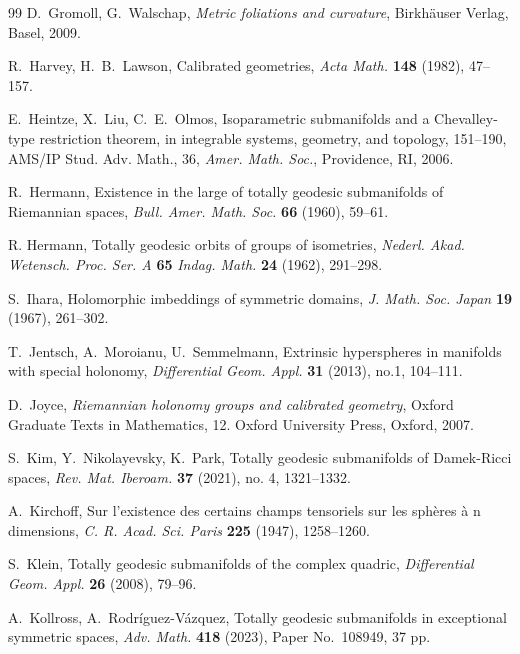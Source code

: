 \documentclass[11pt,a4paper,final]{amsart}
\theoremstyle{definition}
\begin{document}
\begin{thebibliography}{99}
	D.~Gromoll, G.~Walschap, \textit{Metric foliations and curvature}, Birkhäuser Verlag, Basel, 2009.

	R.~Harvey, H.~B.~Lawson, Calibrated geometries, \textit{Acta Math.} \textbf{148} (1982), 47--157.

	E.~Heintze, X.~Liu, C.~E.~Olmos, Isoparametric submanifolds and a Chevalley-type restriction theorem, in integrable systems, geometry, and topology, 151--190, AMS/IP Stud. Adv. Math., 36, \textit{Amer. Math.	Soc.}, Providence, RI, 2006.

	R.~Hermann, Existence in the large of totally geodesic submanifolds of Riemannian spaces, \textit{Bull. Amer. Math. Soc.} \textbf{66} (1960), 59--61.

	 R. Hermann, Totally geodesic orbits of groups of isometries, \textit{Nederl. Akad. Wetensch. Proc. Ser. A} \textbf{65} \textit{Indag. Math.} \textbf{24} (1962), 291--298.

	S.~Ihara, Holomorphic imbeddings of symmetric domains, \textit{J. Math. Soc. Japan} \textbf{19} (1967), 261--302.

	T.~Jentsch, A.~Moroianu, U.~Semmelmann, Extrinsic hyperspheres in manifolds with special holonomy, \textit{Differential Geom. Appl.} \textbf{31} (2013), no.1, 104--111.

	 D.~Joyce,  \textit{Riemannian holonomy groups and calibrated geometry}, Oxford Graduate Texts in Mathematics, 12. Oxford University Press, Oxford, 2007.

	S.~Kim, Y.~Nikolayevsky, K.~Park, Totally geodesic submanifolds of Damek-Ricci spaces, \textit{Rev. Mat. Iberoam.} \textbf{37} (2021), no. 4, 1321--1332.

	A.~Kirchoff, Sur l'existence des certains champs tensoriels sur les sphères à n dimensions, \textit{C. R. Acad. Sci. Paris} \textbf{225} (1947), 1258--1260.

	S.~Klein, Totally geodesic submanifolds of the complex quadric, \textit{Differential Geom. Appl.} \textbf{26} (2008), 79--96. 

	A.~Kollross, A.~Rodríguez-Vázquez, Totally geodesic submanifolds in exceptional symmetric spaces, \textit{ Adv. Math.} \textbf{418} (2023), Paper No.~108949, 37 pp.


\end{thebibliography}
\end{document}
